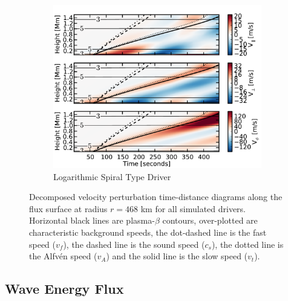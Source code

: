 \begin{figure}
    \begin{subfigure}[b]{0.49\textwidth}
        \includegraphics[width=\columnwidth]{Chapter4/Figs/TD_wave_speeds_Slog_p240_A10_r30_B005.pdf}
        \caption{Logarithmic Spiral Type Driver}
        \label{fig:All_TD_wave_30:Slog}
    \end{subfigure}
    \caption{Decomposed velocity perturbation time-distance diagrams along the flux surface at radius $r = 468$ km for all simulated drivers. Horizontal black lines are plasma-$\beta$ contours, over-plotted are characteristic background speeds, the dot-dashed line is the fast speed ($v_f$), the dashed line is the sound speed ($c_s$), the dotted line is the Alfv\'en speed ($v_A$) and the solid line is the slow speed ($v_t$).}
    \label{fig:All_TD_wave_30}
\end{figure}

\subsection{Wave Energy Flux}\label{sec:energy_flux}

